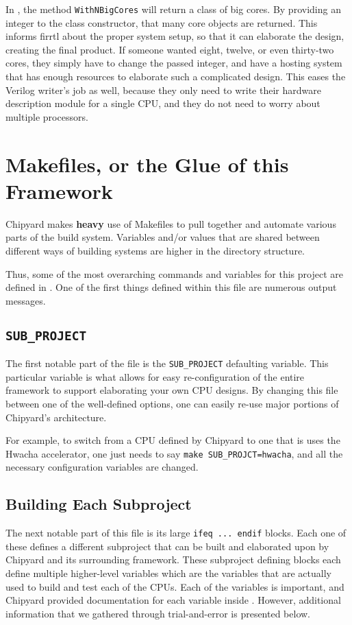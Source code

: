 In , the method \texttt{WithNBigCores} will return a class of big  cores.
By providing an integer to the class constructor, that many core objects are returned.
This informs \gls{firrtl} about the proper system setup, so that it can elaborate the design, creating the final product.
If someone wanted eight, twelve, or even thirty-two cores, they simply have to change the passed integer, and have a hosting system that has enough resources to elaborate such a complicated design.
This eases the Verilog writer's job as well, because they only need to write their hardware description module for a single CPU, and they do not need to worry about multiple processors.

\section{Makefiles, or the Glue of this Framework}\label{sec:Makefiles_in_Chipyard}
Chipyard makes \textbf{heavy} use of Makefiles to pull together and automate various parts of the build system.
Variables and/or values that are shared between different ways of building systems are higher in the directory structure.

Thus, some of the most overarching commands and variables for this project are defined in .
One of the first things defined within this file are numerous output messages.

\subsection{\texttt{SUB\_PROJECT}}\label{subsec:Makefile_SUB_PROJECT}
The first notable part of the  file is the \texttt{SUB\_PROJECT} defaulting variable.
This particular variable is what allows for easy re-configuration of the entire framework to support elaborating your own CPU designs.
By changing this file between one of the well-defined options, one can easily re-use major portions of Chipyard's architecture.

For example, to switch from a CPU defined by Chipyard to one that is uses the Hwacha accelerator, one just needs to say \texttt{make SUB_PROJCT=hwacha}, and all the necessary configuration variables are changed.

\subsection{Building Each Subproject}\label{subsec:Building_Each_Subproject}
The next notable part of this file is its large \texttt{ifeq ... endif} blocks.
Each one of these defines a different subproject that can be built and elaborated upon by Chipyard and its surrounding framework.
These subproject defining blocks each define multiple higher-level variables which are the variables that are actually used to build and test each of the CPUs.
Each of the variables is important, and Chipyard provided documentation for each variable inside .
However, additional information that we gathered through trial-and-error is presented below.


